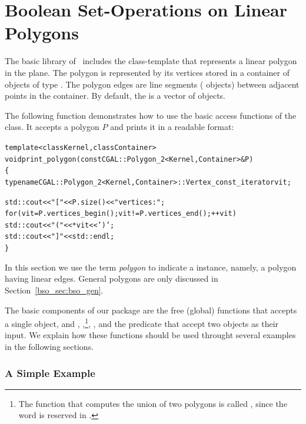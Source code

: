 \section{Boolean Set-Operations on Linear Polygons}
\label{bso_sec:bso_lin}

The basic library of \cgal\ includes the 
class-template that represents a linear polygon in the plane. The
polygon is represented by its vertices stored in a container of
objects of type . The polygon edges are line
segments ( objects) between adjacent points in
the container. By default, the  is a vector of
 objects.

The following function demonstrates how to use the basic access
functions of the  class. It accepts a polygon $P$ and
prints it in a readable format:
\begin{alltt}
template<class Kernel, class Container>
void print_polygon (const CGAL::Polygon_2<Kernel, Container>& P)
\{
  typename CGAL::Polygon_2<Kernel, Container>::Vertex_const_iterator  vit;

  std::cout << "[ " << P.size() << " vertices:";
  for (vit = P.vertices_begin(); vit != P.vertices_end(); ++vit)
    std::cout << " (" << *vit << ')';
  std::cout << " ]" << std::endl;
\}
\end{alltt}

In this section we use the term {\em polygon} to indicate a
 instance, namely, a polygon having linear
edges. General polygons are only discussed in
Section~\ref{bso_sec:bso_gen}.

The basic components of our package are the free (global) functions
 that accepts a single  object, and
, ,\footnote{The function that
computes the union of two polygons is called , since
the word  is reserved in \Cpp.}, ,
 and the predicate 
that accept two  objects as their input. We explain how
these functions should be used throught several examples in the
following sections.

\subsubsection*{A Simple Example}

